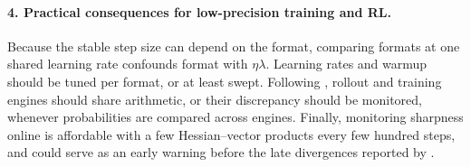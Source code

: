 \documentclass[11pt,letterpaper]{article}
\begin{document}
\paragraph{4. Practical consequences for low-precision training and RL.}
Because the stable step size can depend on the format, comparing formats at one shared learning rate confounds format with $\eta\lambda$. Learning rates and warmup should be tuned per format, or at least swept. Following \citet{Qi2025}, rollout and training engines should share arithmetic, or their discrepancy should be monitored, whenever probabilities are compared across engines. Finally, monitoring sharpness online is affordable with a few Hessian--vector products every few hundred steps, and could serve as an early warning before the late divergences reported by \citet{Fishman2025}.
\end{document}
